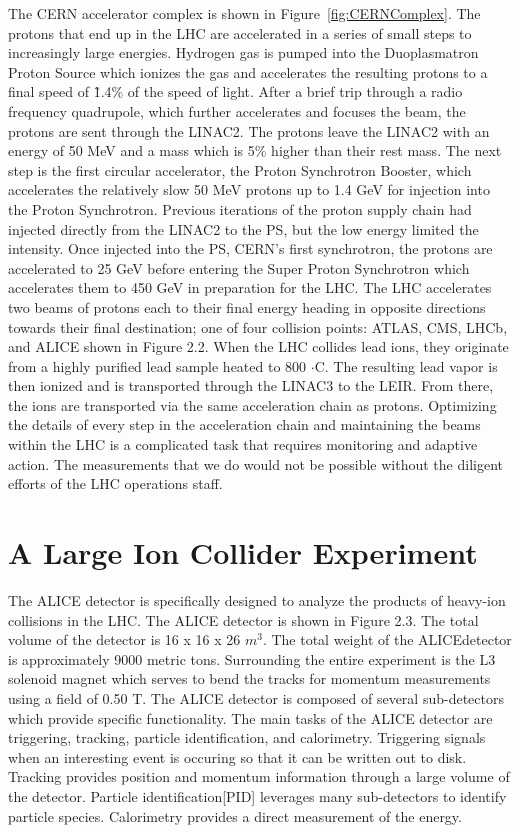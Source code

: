 The CERN accelerator complex is shown in Figure~\ref{fig:CERNComplex}. The protons that end up in the LHC are accelerated in a series of small steps to increasingly large energies. Hydrogen gas is pumped into the Duoplasmatron Proton Source which ionizes the gas and accelerates the resulting protons to a final speed of \~1.4\% of the speed of light. After a brief trip through a radio frequency quadrupole, which further accelerates and focuses the beam, the protons are sent through the LINAC2. The protons leave the LINAC2 with an energy of 50 MeV and a mass which is 5\% higher than their rest mass. The next step is the first circular accelerator, the Proton Synchrotron Booster, which accelerates the relatively slow 50 MeV protons up to 1.4 GeV for injection into the Proton Synchrotron. Previous iterations of the proton supply chain had injected directly from the LINAC2 to the PS, but the low energy limited the intensity. Once injected into the PS, CERN’s first synchrotron, the protons are accelerated to 25 GeV before entering the Super Proton Synchrotron which accelerates them to 450 GeV in preparation for the LHC. The LHC accelerates two beams of protons each to their final energy heading in opposite directions towards their final destination; one of four collision points: ATLAS, CMS, LHCb, and ALICE shown in Figure 2.2. When the LHC collides lead ions, they originate from a highly purified lead sample heated to 800 $\cdot$C. The resulting lead vapor is then ionized and is transported through the LINAC3 to the LEIR. From there, the ions are transported via the same acceleration chain as protons. Optimizing the details of every step in the acceleration chain and maintaining the beams within the LHC is a complicated task that requires monitoring and adaptive action. The measurements that we do would not be possible without the diligent efforts of the LHC operations staff.

\section{A Large Ion Collider Experiment}
The ALICE detector is specifically designed to analyze the products of heavy-ion collisions in the LHC. The ALICE detector is shown in Figure 2.3. The total volume of the detector is 16 x 16 x 26 $m^3$. The total weight of the ALICEdetector is approximately 9000 metric tons. Surrounding the entire experiment is the L3 solenoid magnet which serves to bend the tracks for momentum measurements using a field of 0.50 T. The ALICE detector is composed of several sub-detectors which provide specific functionality. The main tasks of the ALICE detector are triggering, tracking, particle identification, and calorimetry. Triggering signals when an interesting event is occuring so that it can be written out to disk. Tracking provides position and momentum information through a large volume of the detector. Particle identification[PID] leverages many sub-detectors to identify particle species. Calorimetry provides a direct measurement of the energy.

